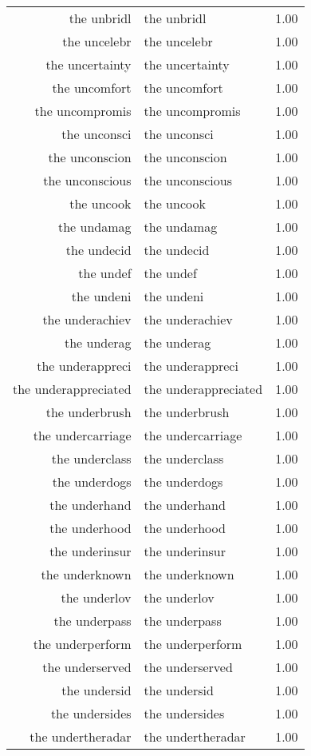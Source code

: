 \begin{table}[ht]
\begin{tabular}{rlr}
  the unbridl & the unbridl & 1.00 \\ 
  the uncelebr & the uncelebr & 1.00 \\ 
  the uncertainty & the uncertainty & 1.00 \\ 
  the uncomfort & the uncomfort & 1.00 \\ 
  the uncompromis & the uncompromis & 1.00 \\ 
  the unconsci & the unconsci & 1.00 \\ 
  the unconscion & the unconscion & 1.00 \\ 
  the unconscious & the unconscious & 1.00 \\ 
  the uncook & the uncook & 1.00 \\ 
  the undamag & the undamag & 1.00 \\ 
  the undecid & the undecid & 1.00 \\ 
  the undef & the undef & 1.00 \\ 
  the undeni & the undeni & 1.00 \\ 
  the underachiev & the underachiev & 1.00 \\ 
  the underag & the underag & 1.00 \\ 
  the underappreci & the underappreci & 1.00 \\ 
  the underappreciated & the underappreciated & 1.00 \\ 
  the underbrush & the underbrush & 1.00 \\ 
  the undercarriage & the undercarriage & 1.00 \\ 
  the underclass & the underclass & 1.00 \\ 
  the underdogs & the underdogs & 1.00 \\ 
  the underhand & the underhand & 1.00 \\ 
  the underhood & the underhood & 1.00 \\ 
  the underinsur & the underinsur & 1.00 \\ 
  the underknown & the underknown & 1.00 \\ 
  the underlov & the underlov & 1.00 \\ 
  the underpass & the underpass & 1.00 \\ 
  the underperform & the underperform & 1.00 \\ 
  the underserved & the underserved & 1.00 \\ 
  the undersid & the undersid & 1.00 \\ 
  the undersides & the undersides & 1.00 \\ 
  the undertheradar & the undertheradar & 1.00 \\ 

\end{tabular}
\end{table}
